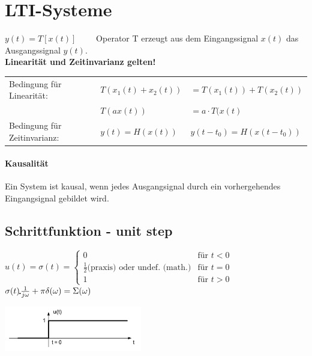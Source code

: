 \section{LTI-Systeme }
\begin{center}
	
\end{center}

$ y(t) = T [ x(t)] \qquad $ Operator T erzeugt aus dem Eingangssignal $ x(t) $ das Ausgangssignal $ y(t)$. \\
\textbf{Linearität und Zeitinvarianz gelten!}\\
\begin{tabular}{lll}
	Bedingung für Linearität: & $T(x_1(t)+x_2(t))$ & $= T(x_1(t)) + T(x_2(t))$ \\
	& $T(ax(t))$ & $= a\cdot T(x(t)$\\
	Bedingung für Zeitinvarianz: & $y(t) = H(x(t))$ & $y(t-t_0) = H(x(t-t_0))$ \\
\end{tabular}

	\paragraph{Kausalität} Ein System ist kausal, wenn jedes Ausgangsignal durch ein vorhergehendes Eingangsignal gebildet wird.
\\

\subsection{Schrittfunktion - unit step}
	\begin{minipage}{10cm}
		$u(t) = \sigma(t) =	\begin{cases}
		  		 0 & \text{für } t < 0 \\
		  		 \frac{1}{2} \text{(praxis)}  \text{ oder undef. (math.)} & \text{für } t = 0 \\
		  		 1 & \text{für } t > 0
		  	\end{cases}
		$
		$\sigma(t) \FT \frac{1}{j\omega} + \pi\delta(\omega) = \Sigma(\omega)$
	\end{minipage}
	\begin{minipage}{8cm}
		\includegraphics[width=6cm]{./bilder/unitstep.png}
	\end{minipage}

